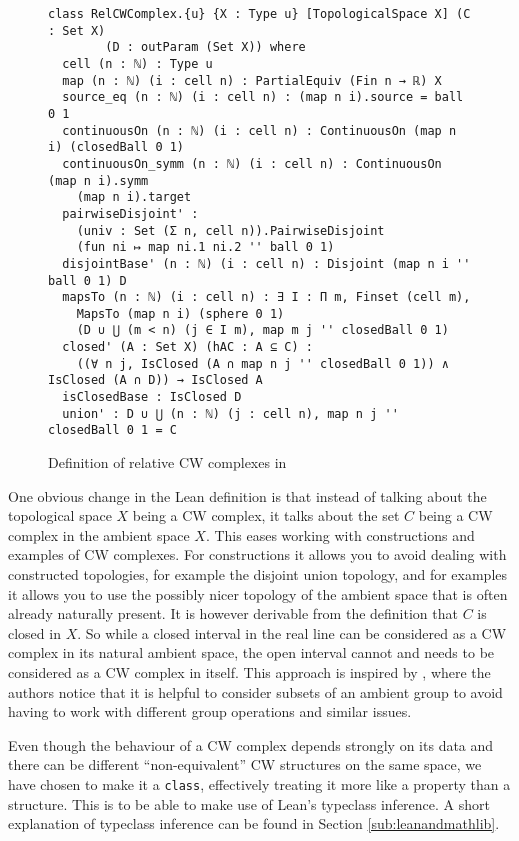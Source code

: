 \begin{figure}
\caption{Definition of relative CW complexes in \mathlib}
\label{fig:def}
\begin{lstlisting}[frame=single]
class RelCWComplex.{u} {X : Type u} [TopologicalSpace X] (C : Set X) 
        (D : outParam (Set X)) where
  cell (n : ℕ) : Type u
  map (n : ℕ) (i : cell n) : PartialEquiv (Fin n → ℝ) X
  source_eq (n : ℕ) (i : cell n) : (map n i).source = ball 0 1
  continuousOn (n : ℕ) (i : cell n) : ContinuousOn (map n i) (closedBall 0 1)
  continuousOn_symm (n : ℕ) (i : cell n) : ContinuousOn (map n i).symm 
    (map n i).target
  pairwiseDisjoint' :
    (univ : Set (Σ n, cell n)).PairwiseDisjoint 
    (fun ni ↦ map ni.1 ni.2 '' ball 0 1)
  disjointBase' (n : ℕ) (i : cell n) : Disjoint (map n i '' ball 0 1) D
  mapsTo (n : ℕ) (i : cell n) : ∃ I : Π m, Finset (cell m),
    MapsTo (map n i) (sphere 0 1) 
    (D ∪ ⋃ (m < n) (j ∈ I m), map m j '' closedBall 0 1)
  closed' (A : Set X) (hAC : A ⊆ C) :
    ((∀ n j, IsClosed (A ∩ map n j '' closedBall 0 1)) ∧ IsClosed (A ∩ D)) → IsClosed A
  isClosedBase : IsClosed D
  union' : D ∪ ⋃ (n : ℕ) (j : cell n), map n j '' closedBall 0 1 = C
\end{lstlisting}
\end{figure}

One obvious change in the Lean definition is that instead of talking about the topological space $X$ being a CW complex, it talks about the set $C$ being a CW complex in the ambient space $X$.
This eases working with constructions and examples of CW complexes. 
For constructions it allows you to avoid dealing with constructed topologies, for example the disjoint union topology, and for examples it allows you to use the possibly nicer topology of the ambient space that is often already naturally present. 
It is however derivable from the definition that $C$ is closed in $X$. 
So while a closed interval in the real line can be considered as a CW complex in its natural ambient space, the open interval cannot and needs to be considered as a CW complex in itself. 
This approach is inspired by \cite{Gonthier2013}, where the authors notice that it is helpful to consider subsets of an ambient group to avoid having to work with different group operations and similar issues.

Even though the behaviour of a CW complex depends strongly on its data and there can be different ``non-equivalent'' CW structures on the same space, we have chosen to make it a \lstinline|class|, effectively treating it more like a property than a structure. 
This is to be able to make use of Lean's typeclass inference.
A short explanation of typeclass inference can be found in Section \ref{sub:leanandmathlib}.

